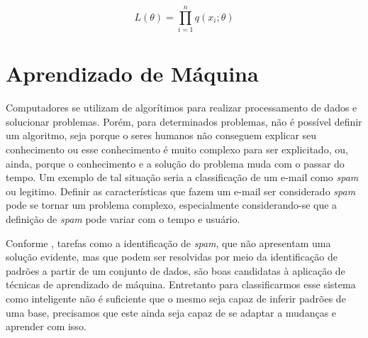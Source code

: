 \documentclass[
    12pt,
    oneside,
    a4paper,
    english,
    brazil
]{abntex2}
\begin{document}
\begin{equation}\label{eq:likelihood}
    L(\theta) = \prod_{i=1}^{n}{q(x_i;\theta)}
\end{equation}

\section{Aprendizado de Máquina}

Computadores se utilizam de algorítimos  para realizar processamento de dados e
solucionar  problemas.  Porém,  para  determinados problemas,  não  é  possível
definir um  algoritmo, seja porque o  seres humanos não conseguem  explicar seu
conhecimento ou  esse conhecimento é  muito complexo para ser  explicitado, ou,
ainda, porque  o conhecimento  e a  solução do  problema muda  com o  passar do
tempo.  Um exemplo  de tal  situação seria  a classificação  de um  e-mail como
\textit{spam} ou legitimo.  Definir as características que fazem  um e-mail ser
considerado \textit{spam}  pode se  tornar um problema  complexo, especialmente
considerando-se que  a definição  de \textit{spam}  pode variar  com o  tempo e
usuário.

Conforme , tarefas como a identificação de \textit{spam}, que
não apresentam  uma solução  evidente, mas  que podem  ser resolvidas  por meio
da  identificação  de padrões  a  partir  de um  conjunto  de  dados, são  boas
candidatas à aplicação  de técnicas de aprendizado de  máquina. Entretanto para
classificarmos esse sistema como inteligente não  é suficiente que o mesmo seja
capaz de inferir padrões  de uma base, precisamos que este  ainda seja capaz de
se adaptar a mudanças e aprender com isso.
\end{document}
